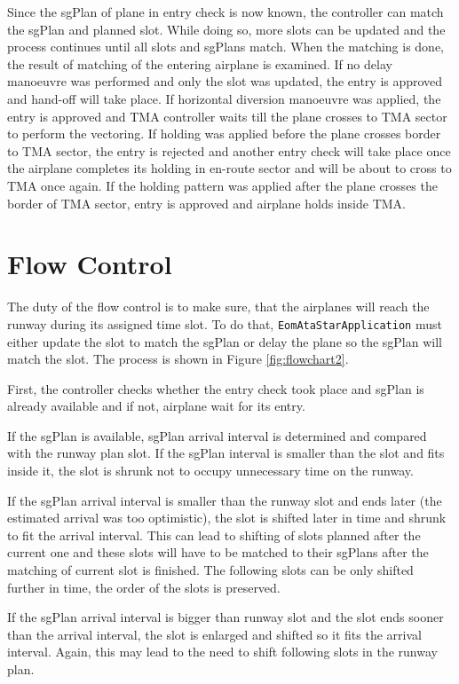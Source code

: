 Since the sgPlan of plane in entry check is now known, the controller can match the sgPlan and planned slot. While doing so, more slots can be updated and the process continues until all slots and sgPlans match. When the matching is done, the result of matching of the entering airplane is examined. If no delay manoeuvre was performed and only the slot was updated, the entry is approved and hand-off will take place. If horizontal diversion manoeuvre was applied, the entry is approved and TMA controller waits till the plane crosses to TMA sector to perform the vectoring. If holding was applied before the plane crosses border to TMA sector, the entry is rejected and another entry check will take place once the airplane completes its holding in en-route sector and will be about to cross to TMA once again. If the holding pattern was applied after the plane crosses the border of TMA sector, entry is approved and airplane holds inside TMA.

\section{Flow Control}

The duty of the flow control is to make sure, that the airplanes will reach the runway during its assigned time slot. To do that, \texttt{EomAtaStarApplication} must either update the slot to match the sgPlan or delay the plane so the sgPlan will match the slot. The process is shown in Figure \ref{fig:flowchart2}.

First, the controller checks whether the entry check took place and sgPlan is already available and if not, airplane wait for its entry.

If the sgPlan is available, sgPlan arrival interval is determined and compared with the runway plan slot. If the sgPlan interval is smaller than the slot and fits inside it, the slot is shrunk not to occupy unnecessary time on the runway.

If the sgPlan arrival interval is smaller than the runway slot and ends later (the estimated arrival was too optimistic), the slot is shifted later in time and shrunk to fit the arrival interval. This can lead to shifting of slots planned after the current one and these slots will have to be matched to their sgPlans after the matching of current slot is finished. The following slots can be only shifted further in time, the order of the slots is preserved.

If the sgPlan arrival interval is bigger than runway slot and the slot ends sooner than the arrival interval, the slot is enlarged and shifted so it fits the arrival interval. Again, this may lead to the need to shift following slots in the runway plan.

